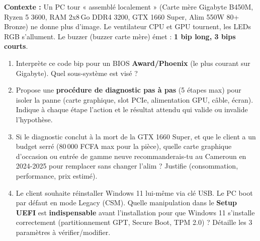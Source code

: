 \documentclass[11pt]{article}
\begin{document}
\begin{exercice}
\textbf{Contexte :} Un PC tour « assemblé localement » (Carte mère Gigabyte B450M, Ryzen 5 3600, RAM 2x8\,Go DDR4 3200, GTX 1660 Super, Alim 550W 80+ Bronze) ne donne plus d'image. Le ventilateur CPU et GPU tournent, les LEDs RGB s'allument. Le buzzer (buzzer carte mère) émet : \textbf{1 bip long, 3 bips courts}.
\begin{enumerate}
    \item Interprète ce code bip pour un BIOS \textbf{Award/Phoenix} (le plus courant sur Gigabyte). Quel sous-système est visé ?
    \item Propose une \textbf{procédure de diagnostic pas à pas} (5 étapes max) pour isoler la panne (carte graphique, slot PCIe, alimentation GPU, câble, écran). Indique à chaque étape l'action et le résultat attendu qui valide ou invalide l'hypothèse.
    \item Si le diagnostic conclut à la mort de la GTX 1660 Super, et que le client a un budget serré (80\,000 FCFA max pour la pièce), quelle carte graphique d'occasion ou entrée de gamme neuve recommanderais-tu au Cameroun en 2024-2025 pour remplacer sans changer l'alim ? Justifie (consommation, performance, prix estimé).
    \item Le client souhaite réinstaller Windows 11 lui-même via clé USB. Le PC boot par défaut en mode Legacy (CSM). Quelle manipulation dans le \textbf{Setup UEFI} est \textbf{indispensable} avant l'installation pour que Windows 11 s'installe correctement (partitionnement GPT, Secure Boot, TPM 2.0) ? Détaille les 3 paramètres à vérifier/modifier.
\end{enumerate}
\end{exercice}
\end{document}
